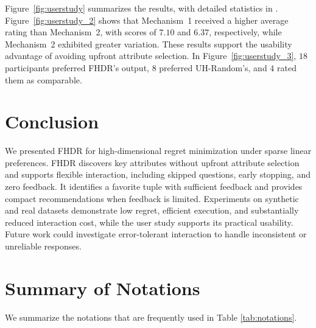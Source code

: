 \documentclass[conference]{IEEEtran}
\theoremstyle{definition}
\theoremstyle{plain}
\newcommand{\technicalreport}{\iftoggle{LinkTechnicalReport}{\href{https://github.com/JunyuLiao/High-dimensional-Regret-Minimization/blob/main/docs/TechnicalReport.pdf}{technical report}}{technical report}}
\begin{document}
Figure~\ref{fig:userstudy} summarizes the results, with detailed statistics in \iftoggle{TechnicalReport}{Section~\ref{appen:user_study} of the \technicalreport}{Appendix~\ref{appen:user_study}}. Figure~\ref{fig:userstudy_2} shows that Mechanism~1 received a higher average rating than Mechanism~2, with scores of $7.10$ and $6.37$, respectively, while Mechanism~2 exhibited greater variation. These results support the usability advantage of avoiding upfront attribute selection. In Figure~\ref{fig:userstudy_3}, $18$ participants preferred FHDR’s output, $8$ preferred UH-Random’s, and $4$ rated them as comparable.




\section{Conclusion}
\label{sec:concl}

We presented FHDR for high-dimensional regret minimization under sparse linear preferences. FHDR discovers key attributes without upfront attribute selection and supports flexible interaction, including skipped questions, early stopping, and zero feedback. It identifies a favorite tuple with sufficient feedback and provides compact recommendations when feedback is limited. Experiments on synthetic and real datasets demonstrate low regret, efficient execution, and substantially reduced interaction cost, while the user study supports its practical usability. Future work could investigate error-tolerant interaction to handle inconsistent or unreliable responses.

\clearpage






\clearpage
\appendices

\section{Summary of Notations}
\label{appen:summary}
We summarize the notations that are frequently used in Table \ref{tab:notations}.
\end{document}

